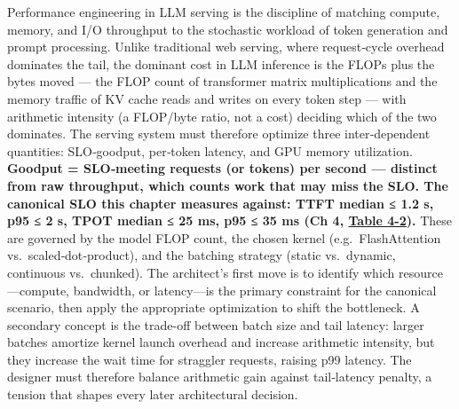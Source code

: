 Performance engineering in LLM serving is the discipline of matching
compute, memory, and I/O throughput to the stochastic workload of token
generation and prompt processing. Unlike traditional web serving, where
request‑cycle overhead dominates the tail, the dominant cost in LLM
inference is the FLOPs plus the bytes moved --- the FLOP count of
transformer matrix multiplications and the memory traffic of KV cache
reads and writes on every token step --- with arithmetic intensity (a
FLOP/byte ratio, not a cost) deciding which of the two dominates. The
serving system must therefore optimize three inter‑dependent quantities:
SLO‑goodput, per‑token latency, and GPU memory utilization.
\textbf{Goodput = SLO‑meeting requests (or tokens) per second ---
distinct from raw throughput, which counts work that may miss the SLO.
The canonical SLO this chapter measures against: TTFT median ≤ 1.2 s,
p95 ≤ 2 s, TPOT median ≤ 25 ms, p95 ≤ 35 ms (Ch 4, \hyperref[tab:4.2]{Table 4-2}).} These
are governed by the model FLOP count, the chosen kernel
(e.g.~FlashAttention vs.~scaled‑dot‑product), and the batching strategy
(static vs.~dynamic, continuous vs.~chunked). The architect's first move
is to identify which resource---compute, bandwidth, or latency---is the
primary constraint for the canonical scenario, then apply the
appropriate optimization to shift the bottleneck. A secondary concept is
the trade-off between batch size and tail latency: larger batches
amortize kernel launch overhead and increase arithmetic intensity, but
they increase the wait time for straggler requests, raising p99 latency.
The designer must therefore balance arithmetic gain against tail‑latency
penalty, a tension that shapes every later architectural decision.

\label{mental-model}


